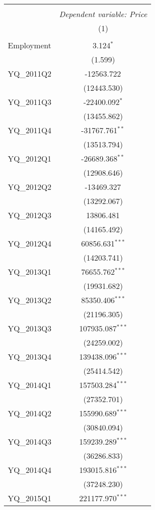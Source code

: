 \begin{table}[!htbp] \centering
\begin{tabular}{@{\extracolsep{5pt}}lc}
\\[-1.8ex]\hline
\hline \\[-1.8ex]
& \multicolumn{1}{c}{\textit{Dependent variable: Price}} \
\cr \cline{2-2}
\\[-1.8ex] & (1) \\
\hline \\[-1.8ex]
 Employment & 3.124$^{*}$ \\
& (1.599) \\
 YQ_2011Q2 & -12563.722$^{}$ \\
& (12443.530) \\
 YQ_2011Q3 & -22400.092$^{*}$ \\
& (13455.862) \\
 YQ_2011Q4 & -31767.761$^{**}$ \\
& (13513.794) \\
 YQ_2012Q1 & -26689.368$^{**}$ \\
& (12908.646) \\
 YQ_2012Q2 & -13469.327$^{}$ \\
& (13292.067) \\
 YQ_2012Q3 & 13806.481$^{}$ \\
& (14165.492) \\
 YQ_2012Q4 & 60856.631$^{***}$ \\
& (14203.741) \\
 YQ_2013Q1 & 76655.762$^{***}$ \\
& (19931.682) \\
 YQ_2013Q2 & 85350.406$^{***}$ \\
& (21196.305) \\
 YQ_2013Q3 & 107935.087$^{***}$ \\
& (24259.002) \\
 YQ_2013Q4 & 139438.096$^{***}$ \\
& (25414.542) \\
 YQ_2014Q1 & 157503.284$^{***}$ \\
& (27352.701) \\
 YQ_2014Q2 & 155990.689$^{***}$ \\
& (30840.094) \\
 YQ_2014Q3 & 159239.289$^{***}$ \\
& (36286.833) \\
 YQ_2014Q4 & 193015.816$^{***}$ \\
& (37248.230) \\
 YQ_2015Q1 & 221177.970$^{***}$ \\

\end{tabular}
\end{table}
